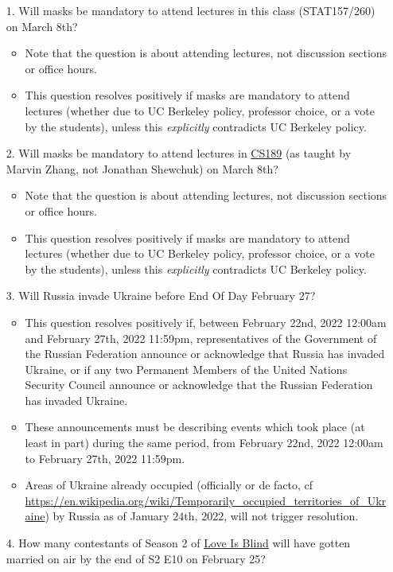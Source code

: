 \documentclass[11pt]{article}
\begin{document}
\begin{enumerate}
	\item[1.] Will masks be mandatory to attend lectures in this class (STAT157/260) on March 8th?
	\begin{itemize}
		\item Note that the question is about attending lectures, not discussion sections or office hours.
		\item This question resolves positively if masks are mandatory to attend lectures (whether due to UC Berkeley policy, professor choice, or a vote by the students), unless this \emph{explicitly} contradicts UC Berkeley policy.
	\end{itemize}
	\item[2.] Will masks be mandatory to attend lectures in \href{https://www.eecs189.org/about/}{CS189} (as taught by Marvin Zhang, not Jonathan Shewchuk) on March 8th?
	\begin{itemize}
		\item Note that the question is about attending lectures, not discussion sections or office hours.
		\item This question resolves positively if masks are mandatory to attend lectures (whether due to UC Berkeley policy, professor choice, or a vote by the students), unless this \emph{explicitly} contradicts UC Berkeley policy.
	\end{itemize} 
	\item[3.] Will Russia invade Ukraine before End Of Day February 27?
	\begin{itemize}
		\item This question resolves positively if, between February 22nd, 2022 12:00am and February 27th, 2022 11:59pm, representatives of the Government of the Russian Federation announce or acknowledge that Russia has invaded Ukraine, or if any two Permanent Members of the United Nations Security Council announce or acknowledge that the Russian Federation has invaded Ukraine. 

		\item These announcements must be describing events which took place (at least in part) during the same period, from February 22nd, 2022 12:00am to February 27th, 2022 11:59pm. 
		
		\item Areas of Ukraine already occupied (officially or de facto, cf \url{https://en.wikipedia.org/wiki/Temporarily_occupied_territories_of_Ukraine}) by Russia as of January 24th, 2022, will not trigger resolution.
	\end{itemize} 
	\item[4.] How many contestants of Season 2 of \href{https://en.wikipedia.org/wiki/Love_Is_Blind_(TV_series)}{Love Is Blind} will have gotten married on air by the end of S2 E10 on February 25?
\end{enumerate}
\end{document}
